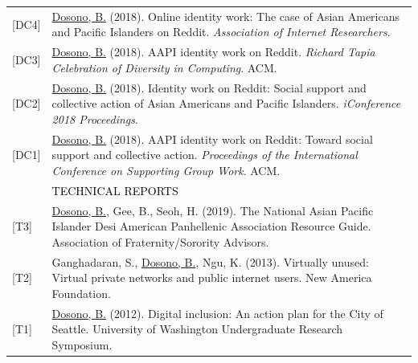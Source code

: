 \documentclass[12pt]{article}
\begin{document}
{\begin{longtable}{R{0.75in}p{5.0in}}
\footnotesize{[DC4]} & \href{https://web.archive.org/web/20210309183350/https://aoir2018.sched.com/event/HPAQ/doctoral-colloquium}{Dosono, B.} (2018). Online identity work: The case of Asian Americans and Pacific Islanders on Reddit. \textit{Association of Internet Researchers}.\\

\footnotesize{[DC3]} & \href{https://tapiaconference.cmd-it.org/wp-content/uploads/2020/06/Tapia-Conference-2018-Program.pdf}{Dosono, B.} (2018). AAPI identity work on Reddit. \textit{Richard Tapia Celebration of Diversity in Computing}. ACM.\\

\footnotesize{[DC2]} & \href{https://web.archive.org/web/20180329142759/http://ischools.org/the-iconference/program/doctoral-colloquium/2018-doctoral-colloquium/}{Dosono, B.} (2018). Identity work on Reddit: Social support and collective action of Asian Americans and Pacific Islanders. \textit{iConference 2018 Proceedings}.\\

\footnotesize{[DC1]} & \href{https://dl.acm.org/authorize?N42808}{Dosono, B.} (2018). AAPI identity work on Reddit: Toward social support and collective action. \textit{Proceedings of the International Conference on Supporting Group Work}. ACM. \medskip \\

& \large \textcolor{black}{\uppercase{Technical Reports}}\\


\footnotesize{[T3]} & \href{https://web.archive.org/web/20201119093749/https://cdn.ymaws.com/www.afa1976.org/resource/resmgr/guides/afa-2019-resourceguide-napa-.pdf}{Dosono, B.}, Gee, B., Seoh, H. (2019). The National Asian Pacific Islander Desi American Panhellenic Association Resource Guide. Association of Fraternity/Sorority Advisors.\\

\footnotesize{[T2]} & Ganghadaran, S., \href{https://www.newamerica.org/oti/policy-papers/virtually-unused/}{Dosono, B.}, Ngu, K. (2013). Virtually unused: Virtual private networks and public internet users. New America Foundation.\\

\footnotesize{[T1]} & \href{https://web.archive.org/web/20220701074124/https://expo.uw.edu/expo/apply/238/proceedings/offering_session/431.pdf}{Dosono, B.} (2012). Digital inclusion: An action plan for the City of Seattle. University of Washington Undergraduate Research Symposium. \medskip \\


\end{longtable}}
\end{document}
